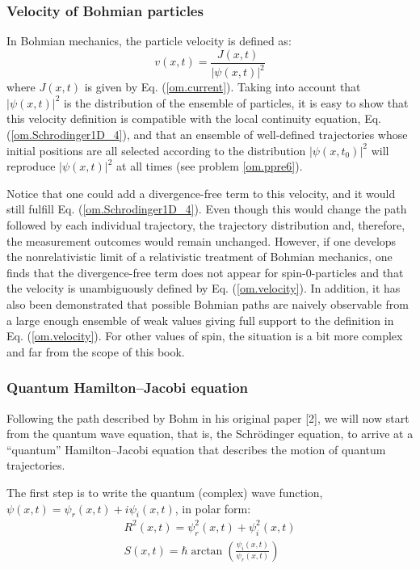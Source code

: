 \documentclass[nofootinbib, secnumarabic, amsmath, nobibnotes,10pt,aps,pra]{revtex4-1}
\newcommand{\eref}[1]{Eq. (\ref{#1})}
\begin{document}
\subsubsection{Velocity of Bohmian particles}

In Bohmian mechanics, the particle velocity is defined as:
\begin{equation}
\label{om.velocity}
v(x,t) = \frac{J(x,t)}{|\psi(x,t)|^2}
\end{equation}
where $J(x,t)$ is given by \eref{om.current}.
Taking into account that $|\psi(x,t)|^2$ is the distribution of the ensemble of particles, it is easy to show that this velocity definition is compatible with the local continuity equation, \eref{om.Schrodinger1D_4}, and that an ensemble of well-defined trajectories whose initial positions are all selected according to the distribution $|\psi(x,t_0)|^2$ will reproduce $|\psi(x,t)|^2$ at all times (see problem \ref{om.ppre6}).

Notice that one could add a divergence-free term to this velocity, and it would still fulfill \eref{om.Schrodinger1D_4}. Even though this would change the path followed by each individual trajectory, the trajectory distribution and, therefore, the measurement outcomes would remain unchanged.
However, if one develops the nonrelativistic limit of a relativistic treatment of Bohmian mechanics, one finds that the divergence-free  term does not appear for spin-0-particles and that the velocity is unambiguously defined by \eref{om.velocity}. In addition, it has also been demonstrated that possible Bohmian paths are naively observable from a large enough ensemble of weak values \cite{om.wiseman2007,om.4marian,om.7colomes} giving full support to the definition in \eref{om.velocity}. For other values of spin, the situation is a bit more complex \cite{om.ward2010,om.Holland1999,om.Holland2003} and far from the scope of this book.

\subsubsection{Quantum Hamilton--Jacobi equation}\label{sec.quantum_HJ.om}

Following the path described by Bohm in his original paper  [2], we
will now start from the quantum wave equation, that is, the
Schr\"odinger equation, to arrive at a ``quantum'' Hamilton--Jacobi
equation that describes the motion of quantum trajectories.

The first step is to write the quantum (complex) wave function, $\psi(x,t) = \psi_r(x,t) + i \psi_i(x,t)$, in polar form:
\begin{eqnarray}
R^2(x,t) = \psi_{r}^2(x,t) + \psi_{i}^2(x,t) \label{om.polar1D_1} \\
S(x,t) = \hbar \arctan \left(\frac {\psi_{i}(x,t)} {\psi_{r}(x,t)} \right)
\label{om.polar1D_2}
\end{eqnarray}
\end{document}
